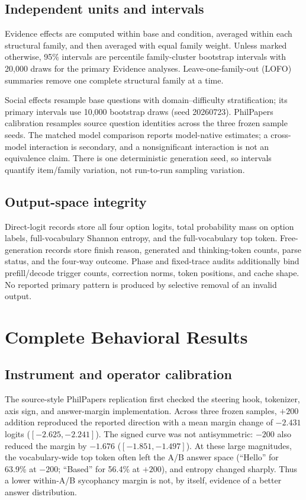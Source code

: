 \documentclass[letterpaper]{article}
\begin{document}
\subsection{Independent units and intervals}

Evidence effects are computed within base and condition, averaged within each structural family, and then averaged with equal family weight.  Unless marked otherwise, 95\% intervals are percentile family-cluster bootstrap intervals with 20,000 draws for the primary Evidence analyses.  Leave-one-family-out (LOFO) summaries remove one complete structural family at a time.

Social effects resample base questions with domain--difficulty stratification; its primary intervals use 10,000 bootstrap draws (seed 20260723).  PhilPapers calibration resamples source question identities across the three frozen sample seeds.  The matched model comparison reports model-native estimates; a cross-model interaction is secondary, and a nonsignificant interaction is not an equivalence claim.  There is one deterministic generation seed, so intervals quantify item/family variation, not run-to-run sampling variation.

\subsection{Output-space integrity}

Direct-logit records store all four option logits, total probability mass on option labels, full-vocabulary Shannon entropy, and the full-vocabulary top token.  Free-generation records store finish reason, generated and thinking-token counts, parse status, and the four-way outcome.  Phase and fixed-trace audits additionally bind prefill/decode trigger counts, correction norms, token positions, and cache shape.  No reported primary pattern is produced by selective removal of an invalid output.

\section{Complete Behavioral Results}
\label{supp:behavior}

\subsection{Instrument and operator calibration}

The source-style PhilPapers replication first checked the steering hook, tokenizer, axis sign, and answer-margin implementation.  Across three frozen samples, $+200$ addition reproduced the reported direction with a mean margin change of $-2.431$ logits ($[-2.625,-2.241]$).  The signed curve was not antisymmetric: $-200$ also reduced the margin by $-1.676$ ($[-1.851,-1.497]$).  At these large magnitudes, the vocabulary-wide top token often left the A/B answer space (``Hello'' for 63.9\% at $-200$; ``Based'' for 56.4\% at $+200$), and entropy changed sharply.  Thus a lower within-A/B sycophancy margin is not, by itself, evidence of a better answer distribution.
\end{document}

